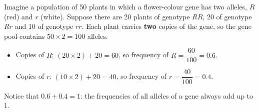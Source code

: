 \documentclass[11pt]{article}
\begin{document}
\begin{exemplebox}
Imagine a population of 50 plants in which a flower-colour gene has two alleles, $R$ (red) and $r$ (white). Suppose there are 20 plants of genotype $RR$, 20 of genotype $Rr$ and 10 of genotype $rr$. Each plant carries \textbf{two} copies of the gene, so the gene pool contains $50 \times 2 = 100$ alleles.
\begin{itemize}
\item Copies of $R$: $(20 \times 2) + 20 = 60$, so frequency of $R = \dfrac{60}{100} = 0.6$.
\item Copies of $r$: $(10 \times 2) + 20 = 40$, so frequency of $r = \dfrac{40}{100} = 0.4$.
\end{itemize}
Notice that $0.6 + 0.4 = 1$: the frequencies of all alleles of a gene always add up to 1.
\end{exemplebox}
\end{document}
